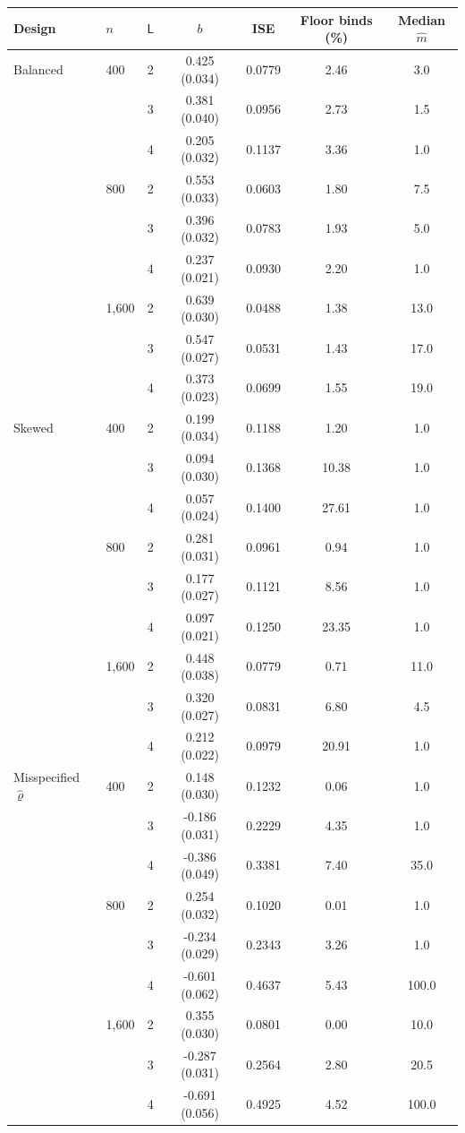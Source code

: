 \begin{tabular}{llccccc}
\toprule
Design & $n$ & $\mathsf L$ & $b$ & ISE & Floor binds (\%) & Median $\hat m$ \\
\midrule
Balanced & 400 & 2 & 0.425 (0.034) & 0.0779 & 2.46 & 3.0 \\
 &  & 3 & 0.381 (0.040) & 0.0956 & 2.73 & 1.5 \\
 &  & 4 & 0.205 (0.032) & 0.1137 & 3.36 & 1.0 \\
 & 800 & 2 & 0.553 (0.033) & 0.0603 & 1.80 & 7.5 \\
 &  & 3 & 0.396 (0.032) & 0.0783 & 1.93 & 5.0 \\
 &  & 4 & 0.237 (0.021) & 0.0930 & 2.20 & 1.0 \\
 & 1,600 & 2 & 0.639 (0.030) & 0.0488 & 1.38 & 13.0 \\
 &  & 3 & 0.547 (0.027) & 0.0531 & 1.43 & 17.0 \\
 &  & 4 & 0.373 (0.023) & 0.0699 & 1.55 & 19.0 \\
\addlinespace
Skewed & 400 & 2 & 0.199 (0.034) & 0.1188 & 1.20 & 1.0 \\
 &  & 3 & 0.094 (0.030) & 0.1368 & 10.38 & 1.0 \\
 &  & 4 & 0.057 (0.024) & 0.1400 & 27.61 & 1.0 \\
 & 800 & 2 & 0.281 (0.031) & 0.0961 & 0.94 & 1.0 \\
 &  & 3 & 0.177 (0.027) & 0.1121 & 8.56 & 1.0 \\
 &  & 4 & 0.097 (0.021) & 0.1250 & 23.35 & 1.0 \\
 & 1,600 & 2 & 0.448 (0.038) & 0.0779 & 0.71 & 11.0 \\
 &  & 3 & 0.320 (0.027) & 0.0831 & 6.80 & 4.5 \\
 &  & 4 & 0.212 (0.022) & 0.0979 & 20.91 & 1.0 \\
\addlinespace
Misspecified $\hat\varrho$ & 400 & 2 & 0.148 (0.030) & 0.1232 & 0.06 & 1.0 \\
 &  & 3 & -0.186 (0.031) & 0.2229 & 4.35 & 1.0 \\
 &  & 4 & -0.386 (0.049) & 0.3381 & 7.40 & 35.0 \\
 & 800 & 2 & 0.254 (0.032) & 0.1020 & 0.01 & 1.0 \\
 &  & 3 & -0.234 (0.029) & 0.2343 & 3.26 & 1.0 \\
 &  & 4 & -0.601 (0.062) & 0.4637 & 5.43 & 100.0 \\
 & 1,600 & 2 & 0.355 (0.030) & 0.0801 & 0.00 & 10.0 \\
 &  & 3 & -0.287 (0.031) & 0.2564 & 2.80 & 20.5 \\
 &  & 4 & -0.691 (0.056) & 0.4925 & 4.52 & 100.0 \\
\bottomrule
\end{tabular}
